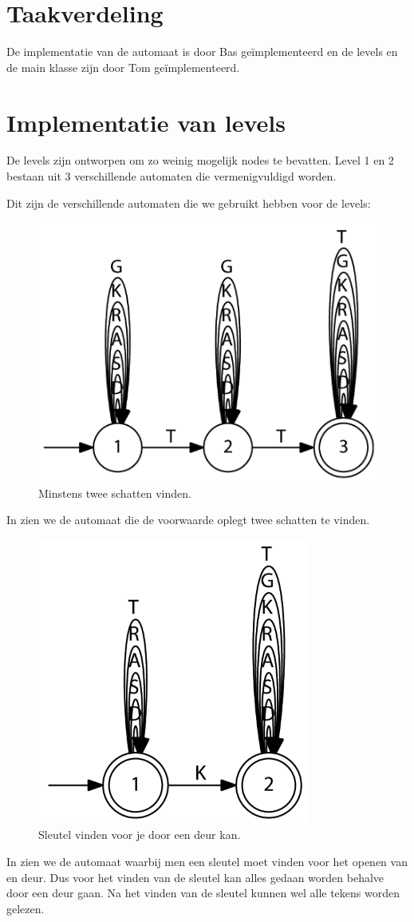 \documentclass[a4paper, 11pt]{article}
\begin{document}
		\section{Taakverdeling}
		De implementatie van de automaat is door Bas geïmplementeerd en de levels en de main klasse zijn door Tom geïmplementeerd.
		
		\section{Implementatie van levels}
		De levels zijn ontworpen om zo weinig mogelijk nodes te bevatten. Level 1 en 2 bestaan uit 3 verschillende automaten die vermenigvuldigd worden. 
		
		Dit zijn de verschillende automaten die we gebruikt hebben voor de levels:
		
		\begin{figure}[H]
			\centering
			\includegraphics[width=0.4\linewidth]{2schatten}
			\caption{Minstens twee schatten vinden.}
			\label{fig:2schatten}
		\end{figure}
		
		In  zien we de automaat die de voorwaarde oplegt twee schatten te vinden. 
	
		
		\begin{figure}[H]
			\centering
			\includegraphics[width=0.3\linewidth]{sleutel}
			\caption{Sleutel vinden voor je door een deur kan.}
			\label{fig:sleutel}
		\end{figure}
	
		In  zien we de automaat waarbij men een sleutel moet vinden voor het openen van en deur. Dus voor het vinden van de sleutel kan alles gedaan worden behalve door een deur gaan. Na het vinden van de sleutel kunnen wel alle tekens worden gelezen.	
		
\end{document}
